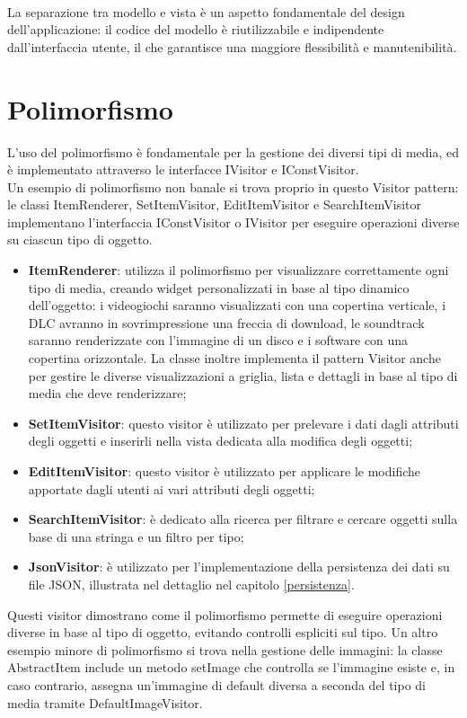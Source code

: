 \documentclass[10pt]{article}
\begin{document}
\\La separazione tra modello e vista è un aspetto fondamentale del design dell'applicazione: il codice del modello è riutilizzabile e indipendente dall'interfaccia utente, il che garantisce una maggiore flessibilità e manutenibilità.

\section{Polimorfismo}
L'uso del polimorfismo è fondamentale per la gestione dei diversi tipi di media, ed è implementato attraverso le interfacce IVisitor e IConstVisitor.
\\Un esempio di polimorfismo non banale si trova proprio in questo Visitor pattern: le classi ItemRenderer, SetItemVisitor, EditItemVisitor e SearchItemVisitor implementano l'interfaccia IConstVisitor o IVisitor per eseguire operazioni diverse su ciascun tipo di oggetto.
\begin{itemize}
    \item \textbf{ItemRenderer}: utilizza il polimorfismo per visualizzare correttamente ogni tipo di media, creando widget personalizzati in base al tipo dinamico dell'oggetto: i videogiochi saranno visualizzati con una copertina verticale, i DLC avranno in sovrimpressione una freccia di download, le soundtrack saranno renderizzate con l'immagine di un disco e i software con una copertina orizzontale. La classe inoltre implementa il pattern Visitor anche per gestire le diverse visualizzazioni a griglia, lista e dettagli in base al tipo di media che deve renderizzare;
    \item \textbf{SetItemVisitor}: questo visitor è utilizzato per prelevare i dati dagli attributi degli oggetti e inserirli nella vista dedicata alla modifica degli oggetti;
    \item \textbf{EditItemVisitor}: questo visitor è utilizzato per applicare le modifiche apportate dagli utenti ai vari attributi degli oggetti;
    \item \textbf{SearchItemVisitor}: è dedicato alla ricerca per filtrare e cercare oggetti sulla base di una stringa e un filtro per tipo;
    \item \textbf{JsonVisitor}: è utilizzato per l'implementazione della persistenza dei dati su file JSON, illustrata nel dettaglio nel capitolo \ref{persistenza}.
\end{itemize}
Questi visitor dimostrano come il polimorfismo permette di eseguire operazioni diverse in base al tipo di oggetto, evitando controlli espliciti sul tipo. Un altro esempio minore di polimorfismo si trova nella gestione delle immagini: la classe AbstractItem include un metodo setImage che controlla se l'immagine esiste e, in caso contrario, assegna un'immagine di default diversa a seconda del tipo di media tramite DefaultImageVisitor.
\end{document}
